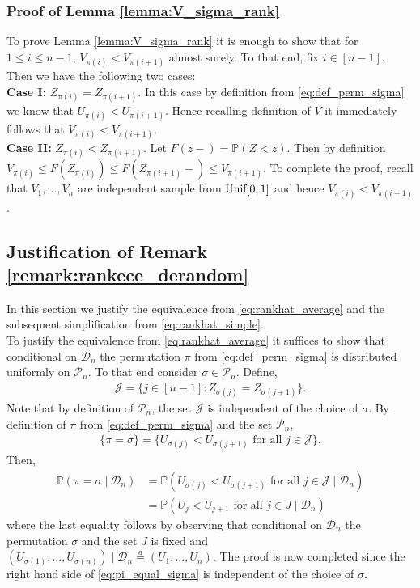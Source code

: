 \documentclass[11pt]{article}
\numberwithin{equation}{section}
\theoremstyle{definition}
\renewcommand{\P}{\mathbb{P}}
\newcommand{\cD}{\mathcal{D}}
\newcommand{\cP}{\mathcal{P}}
\begin{document}
\subsubsection{Proof of Lemma \ref{lemma:V_sigma_rank}}
To prove Lemma \ref{lemma:V_sigma_rank} it is enough to show that for $1\leq i\leq n-1$, $V_{\pi(i)}<V_{\pi(i+1)}$ almost surely. To that end, fix $i\in [n-1]$. Then we have the following two cases:\\
\textbf{Case I:} $Z_{\pi(i)} = Z_{\pi(i+1)}$. In this case by definition from \eqref{eq:def_perm_sigma} we know that $U_{\pi(i)}<U_{\pi(i+1)}$. Hence recalling definition of $V$ it immediately follows that $V_{\pi(i)}<V_{\pi(i+1)}$.\\
\textbf{Case II:} $Z_{\pi(i)}<Z_{\pi(i+1)}$. Let $F(z-) = \P(Z<z)$. Then by definition $V_{\pi(i)}\leq F(Z_{\pi(i)})\leq F(Z_{\pi(i+1)}-)\leq V_{\pi(i+1)}$. To complete the proof, recall that $V_1,\ldots, V_n$ are independent sample from $\textnormal{Unif}[0,1]$ and hence $V_{\pi(i)}<V_{\pi(i+1)}$.

\subsection{Justification of Remark \ref{remark:rankece_derandom}}

In this section we justify the equivalence from \eqref{eq:rankhat_average} and the subsequent simplification from \eqref{eq:rankhat_simple}.\\

To justify the equivalence from \eqref{eq:rankhat_average} it suffices to show that conditional on $\cD_n$ the permutation $\pi$ from \eqref{eq:def_perm_sigma} is distributed uniformly on $\cP_n$. To that end consider $\sigma\in \cP_n$. Define,
\begin{align*}
    \mathcal J = \{j\in [n-1]:Z_{\sigma(j)} = Z_{\sigma(j+1)}\}.
\end{align*}
Note that by definition of $\cP_n$, the set $\mathcal J$ is independent of the choice of $\sigma$. By definition of $\pi$ from \eqref{eq:def_perm_sigma} and the set $\cP_n$,
\begin{align*}
    \{\pi = \sigma\} = \{U_{\sigma(j)}<U_{\sigma(j+1)}\text{ for all }j\in \mathcal J\}.
\end{align*}
Then,
\begin{align}\label{eq:pi_equal_sigma}
    \P\left(\pi = \sigma\mid\cD_n\right) 
    & = \P\left(U_{\sigma(j)}<U_{\sigma(j+1)}\text{ for all }j\in \mathcal J\mid\cD_n\right)\nonumber\\
    & = \P\left(U_j<U_{j+1}\text{ for all }j\in J\mid\cD_n\right)
\end{align}
where the last equality follows by observing that conditional on $\cD_n$ the permutation $\sigma$ and the set $J$ is fixed and $(U_{\sigma(1)},\ldots, U_{\sigma(n)})\mid \cD_n \overset{d}{=} (U_1,\ldots, U_n)$. The proof is now completed since the right hand side of \eqref{eq:pi_equal_sigma} is independent of the choice of $\sigma$.\\
\end{document}
